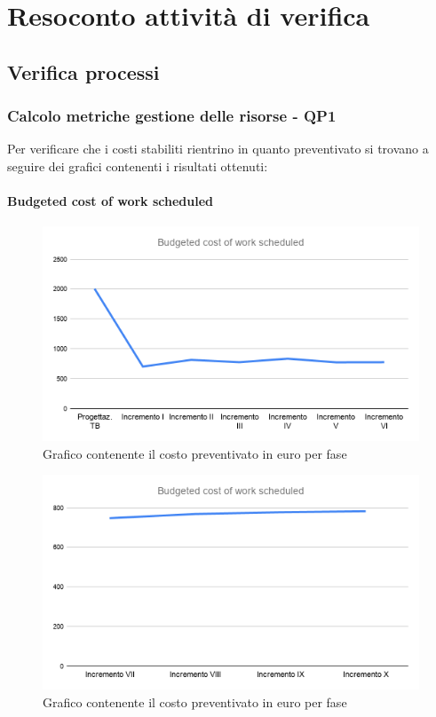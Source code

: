 \appendix
{}

\section{Resoconto attività di verifica}
	
\subsection{Verifica processi}

\subsubsection{Calcolo metriche gestione delle risorse - QP1}
Per verificare che i costi stabiliti rientrino in quanto preventivato si trovano a seguire dei grafici contenenti i risultati ottenuti:

	\paragraph{Budgeted cost of work scheduled}
		\begin{figure}[H]
			\centering
			\includegraphics[width=0.8\linewidth]{./res/images/BCWS_1.png}
			\caption{Grafico contenente il costo preventivato in euro per fase}
			\label{fig:Grafico contenente il costo preventivato in euro per fase}
		\end{figure}
		\begin{figure}[H]
			\centering
			\includegraphics[width=0.8\linewidth]{./res/images/BCWS_2.png}
			\caption{Grafico contenente il costo preventivato in euro per fase}
			\label{fig:Grafico contenente il costo preventivato in euro per fase}
		\end{figure}

